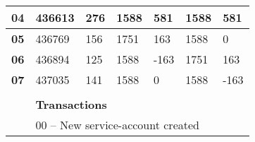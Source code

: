 \documentclass[../NFTComp_IEEE.tex]{subfiles}
\begin{document}
\begin{table}[ht]
{\begin{tabular}{lllllll}
            \multicolumn{1}{|l|}{\textbf{04}}                  & \multicolumn{1}{l|}{436613}                                                        & \multicolumn{1}{l|}{276}                & \multicolumn{1}{l|}{1588}               & \multicolumn{1}{l|}{581}        & \multicolumn{1}{l|}{1588}            & \multicolumn{1}{l|}{581}        \\ \hline
            \multicolumn{1}{|l|}{\textbf{05}}                  & \multicolumn{1}{l|}{436769}                                                        & \multicolumn{1}{l|}{156}                & \multicolumn{1}{l|}{1751}               & \multicolumn{1}{l|}{163}        & \multicolumn{1}{l|}{1588}            & \multicolumn{1}{l|}{0}          \\ \hline
            \multicolumn{1}{|l|}{\textbf{06}}                  & \multicolumn{1}{l|}{436894}                                                        & \multicolumn{1}{l|}{125}                & \multicolumn{1}{l|}{1588}               & \multicolumn{1}{l|}{-163}       & \multicolumn{1}{l|}{1751}            & \multicolumn{1}{l|}{163}        \\ \hline
            \multicolumn{1}{|l|}{\textbf{07}}                  & \multicolumn{1}{l|}{437035}                                                        & \multicolumn{1}{l|}{141}                & \multicolumn{1}{l|}{1588}               & \multicolumn{1}{l|}{0}          & \multicolumn{1}{l|}{1588}            & \multicolumn{1}{l|}{-163}       \\ \hline
                                                               &                                                                                    &                                         &                                         &                                 &                                      &
            \\
            \cline{2-7}
            \multicolumn{1}{c|}{}                              & \multicolumn{6}{l|}{\textbf{Transactions}}                                                                                                                                                                                                                                        \\ \cline{2-7}
            \multicolumn{1}{l|}{}                              & \multicolumn{6}{l|}{00 – New service-account created}                                                                                                                                                                                                                             \\ \cline{2-7}

\end{tabular}}
\end{table}
\end{document}
